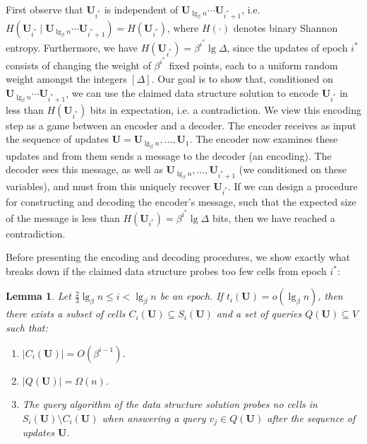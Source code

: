 \documentclass[letterpaper]{article}
\newtheorem{lemma}{Lemma}
\newcommand{\is}{{i^*}}
\newcommand{\U}{\textbf{U}}
\begin{document}
First observe that $\U_\is$ is independent of $\U_{\lg_\beta n} \cdots
\U_{\is+1}$, i.e. $H(\U_\is \mid \U_{\lg_\beta n} \cdots
\U_{\is+1})=H(\U_\is)$, where $H(\cdot)$ denotes binary Shannon
entropy. Furthermore, we have $H(\U_\is)=\beta^\is \lg \Delta$, since
the updates of epoch $\is$ consists of changing the weight of
$\beta^\is$ fixed points, each to a uniform random weight amongst the
integers $[\Delta]$. Our goal is to show that, conditioned on
$\U_{\lg_\beta n} \cdots \U_{\is+1}$, we can use the claimed data
structure solution to encode $\U_\is$ in less than $H(\U_\is)$ bits in
expectation, i.e. a contradiction. We view this encoding step as a
game between an encoder and a decoder. The encoder receives as input
the sequence of updates $\U=\U_{\lg_\beta n},\dots,\U_1$. The encoder
now examines these updates and from them sends a message to the
decoder (an encoding). The decoder sees this message, as well as
$\U_{\lg_\beta n}, \dots, \U_{\is+1}$ (we conditioned on these
variables), and must from this uniquely recover $\U_\is$. If we can
design a procedure for constructing and decoding the encoder's
message, such that the expected size of the message is less than
$H(\U_\is)=\beta^\is \lg \Delta$ bits, then we have reached a
contradiction.

Before presenting the encoding and decoding procedures, we show
exactly what breaks down if the claimed data structure probes too few
cells from epoch $\is$:

\begin{lemma}
\label{lem:exstatic}
Let $\tfrac{2}{3}\lg_\beta n \leq i < \lg_\beta n$ be an epoch. If
$t_i(\U)=o(\lg_\beta n)$, then there exists a subset of cells $C_i(\U)
\subseteq S_i(\U)$ and a set of queries $Q(\U) \subseteq V$ such that:
\begin{enumerate}
\item $|C_i(\U)| = O(\beta^{i-1})$.
\item $|Q(\U)| = \Omega(n)$.
\item The query algorithm of the data structure solution probes no
  cells in $S_i(\U) \setminus C_i(\U)$ when answering a query $v_j \in
  Q(\U)$ after the sequence of updates $\U$.
\end{enumerate}
\end{lemma}
\end{document}
